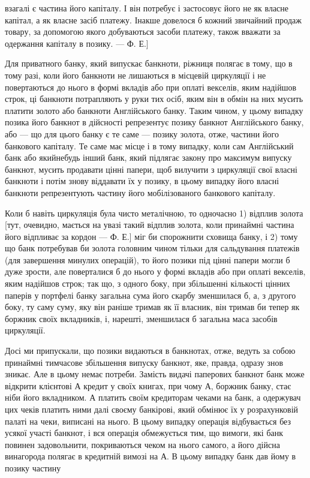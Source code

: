 \parcont{}  %
взагалі є частина його капіталу. І він потребує і застосовує його
не як власне капітал, а як власне засіб платежу. Інакше довелося
б кожний звичайний продаж товару, за допомогою якого
добуваються засоби платежу, також вважати за одержання капіталу
в позику. — Ф. Е.]

Для приватного банку, який випускає банкноти, ріжниця полягає
в тому, що в тому разі, коли його банкноти не лишаються
в місцевій циркуляції і не повертаються до нього в формі
вкладів або при оплаті векселів, яким надійшов строк, ці банкноти
потрапляють у руки тих осіб, яким він в обмін на них
мусить платити золото або банкноти Англійського банку.
Таким чином, у цьому випадку позика його банкнот в дійсності
репрезентує позику банкнот Англійського банку, або — що для
цього банку є те саме — позику золота, отже, частини його
банкового капіталу. Те саме має місце і в тому випадку, коли
сам Англійський банк або якийнебудь інший банк, який підлягає
закону про максимум випуску банкнот, мусить продавати
цінні папери, щоб вилучити з циркуляції свої власні банкноти
і потім знову віддавати їх у позику, в цьому випадку
його власні банкноти репрезентують частину його мобілізованого
банкового капіталу.

Коли б навіть циркуляція була чисто металічною, то одночасно
1) відплив золота [тут, очевидно, мається на увазі такий
відплив золота, коли принаймні частина його відпливає за кордон
— Ф. Е.] міг би спорожнити сховища банку, і 2) тому що
банк потребував би золота головним чином тільки для сальдування
платежів (для завершення минулих операцій), то його позики
під цінні папери могли б дуже зрости, але поверталися б до
нього у формі вкладів або при оплаті векселів, яким надійшов
строк; так що, з одного боку, при збільшенні кількості цінних
паперів у портфелі банку загальна сума його скарбу зменшилася
б, а, з другого боку, ту саму суму, яку він раніше тримав
як її власник, він тримав би тепер як боржник своїх вкладників,
і, нарешті, зменшилася б загальна маса засобів циркуляції.

Досі ми припускали, що позики видаються в банкнотах,
отже, ведуть за собою принаймні тимчасове збільшення випуску
банкнот, яке, правда, одразу знов зникає. Але в цьому
немає потреби. Замість видачі паперових банкнот банк може
відкрити клієнтові А кредит у своїх книгах, при чому А, боржник
банку, стає ніби його вкладником. А платить своїм кредиторам
чеками на банк, а одержувач цих чеків платить ними
далі своєму банкірові, який обмінює їх у розрахунковій палаті на
чеки, виписані на нього. В цьому випадку операція відбувається
без усякої участі банкнот, і вся операція обмежується тим, що
вимоги, які банк повинен задовольнити, покриваються чеком на
нього самого, а його дійсна винагорода полягає в кредитній вимозі
на А. В цьому випадку банк дав йому в позику частину
\parbreak{}  %
